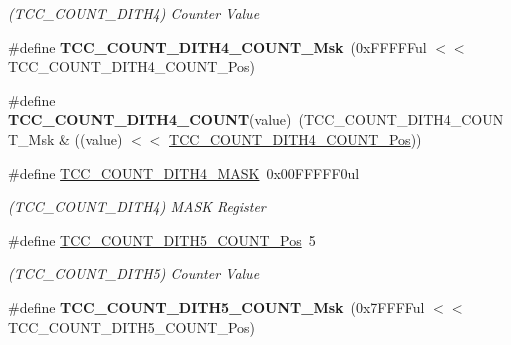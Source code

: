 \begin{DoxyCompactItemize}
\begin{DoxyCompactList}\small\item\em (T\+C\+C\+\_\+\+C\+O\+U\+N\+T\+\_\+\+D\+I\+T\+H4) Counter Value \end{DoxyCompactList}\item 
\hypertarget{group___s_a_m_l21___t_c_c_ga06d479b65c6bed0b52146ec252e272a7}{}\#define {\bfseries T\+C\+C\+\_\+\+C\+O\+U\+N\+T\+\_\+\+D\+I\+T\+H4\+\_\+\+C\+O\+U\+N\+T\+\_\+\+Msk}~(0x\+F\+F\+F\+F\+Ful $<$$<$ T\+C\+C\+\_\+\+C\+O\+U\+N\+T\+\_\+\+D\+I\+T\+H4\+\_\+\+C\+O\+U\+N\+T\+\_\+\+Pos)\label{group___s_a_m_l21___t_c_c_ga06d479b65c6bed0b52146ec252e272a7}

\item 
\hypertarget{group___s_a_m_l21___t_c_c_gaf6d48247342b7ce50a3943ca9036f02f}{}\#define {\bfseries T\+C\+C\+\_\+\+C\+O\+U\+N\+T\+\_\+\+D\+I\+T\+H4\+\_\+\+C\+O\+U\+N\+T}(value)~(T\+C\+C\+\_\+\+C\+O\+U\+N\+T\+\_\+\+D\+I\+T\+H4\+\_\+\+C\+O\+U\+N\+T\+\_\+\+Msk \& ((value) $<$$<$ \hyperlink{group___s_a_m_l21___t_c_c_ga3adcc954f8f4dfa8572a5ac51ce33771}{T\+C\+C\+\_\+\+C\+O\+U\+N\+T\+\_\+\+D\+I\+T\+H4\+\_\+\+C\+O\+U\+N\+T\+\_\+\+Pos}))\label{group___s_a_m_l21___t_c_c_gaf6d48247342b7ce50a3943ca9036f02f}

\item 
\hypertarget{group___s_a_m_l21___t_c_c_gab23ceb193db10567b8ca6de4f464ed99}{}\#define \hyperlink{group___s_a_m_l21___t_c_c_gab23ceb193db10567b8ca6de4f464ed99}{T\+C\+C\+\_\+\+C\+O\+U\+N\+T\+\_\+\+D\+I\+T\+H4\+\_\+\+M\+A\+S\+K}~0x00\+F\+F\+F\+F\+F0ul\label{group___s_a_m_l21___t_c_c_gab23ceb193db10567b8ca6de4f464ed99}

\begin{DoxyCompactList}\small\item\em (T\+C\+C\+\_\+\+C\+O\+U\+N\+T\+\_\+\+D\+I\+T\+H4) M\+A\+S\+K Register \end{DoxyCompactList}\item 
\hypertarget{group___s_a_m_l21___t_c_c_ga6f2bca760853e6c3d56aac5d8ec21bcf}{}\#define \hyperlink{group___s_a_m_l21___t_c_c_ga6f2bca760853e6c3d56aac5d8ec21bcf}{T\+C\+C\+\_\+\+C\+O\+U\+N\+T\+\_\+\+D\+I\+T\+H5\+\_\+\+C\+O\+U\+N\+T\+\_\+\+Pos}~5\label{group___s_a_m_l21___t_c_c_ga6f2bca760853e6c3d56aac5d8ec21bcf}

\begin{DoxyCompactList}\small\item\em (T\+C\+C\+\_\+\+C\+O\+U\+N\+T\+\_\+\+D\+I\+T\+H5) Counter Value \end{DoxyCompactList}\item 
\hypertarget{group___s_a_m_l21___t_c_c_gad0cc849ad9ea03b9ca043e980c302a52}{}\#define {\bfseries T\+C\+C\+\_\+\+C\+O\+U\+N\+T\+\_\+\+D\+I\+T\+H5\+\_\+\+C\+O\+U\+N\+T\+\_\+\+Msk}~(0x7\+F\+F\+F\+Ful $<$$<$ T\+C\+C\+\_\+\+C\+O\+U\+N\+T\+\_\+\+D\+I\+T\+H5\+\_\+\+C\+O\+U\+N\+T\+\_\+\+Pos)\label{group___s_a_m_l21___t_c_c_gad0cc849ad9ea03b9ca043e980c302a52}


\end{DoxyCompactItemize}

